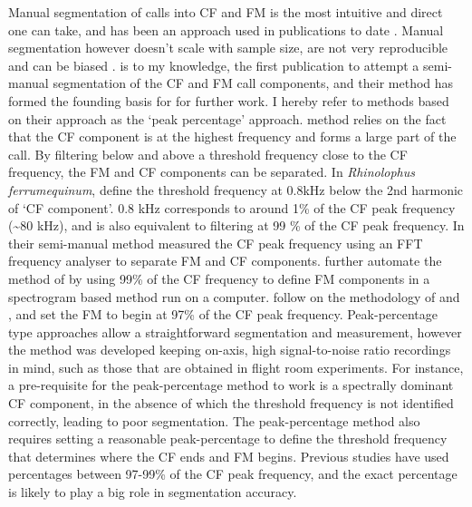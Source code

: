 \documentclass[
]{book}
\begin{document}
Manual segmentation of calls into CF and FM is the most intuitive and direct one can take, and has been an approach used in publications to date \citep{vater2003development, fawcett2015echolocation, gessinger2019unusual}. Manual segmentation however doesn't scale with sample size, are not very reproducible and can be biased \citep{brumm2017measurement}. \citet{tian1997echolocation} is to my knowledge, the first publication to attempt a semi-manual segmentation of the CF and FM call components, and their method has formed the founding basis for for further work. I hereby refer to methods based on their approach as the `peak percentage' approach. \citet{tian1997echolocation} method relies on the fact that the CF component is at the highest frequency and forms a large part of the call. By filtering below and above a threshold frequency close to the CF frequency, the FM and CF components can be separated. In \emph{Rhinolophus ferrumequinum}, \citet{tian1997echolocation} define the threshold frequency at 0.8kHz below the 2nd harmonic of `CF component'. 0.8 kHz corresponds to around 1\% of the CF peak frequency (\textasciitilde80 kHz), and is also equivalent to filtering at 99 \% of the CF peak frequency. In their semi-manual method \citet{tian1997echolocation} measured the CF peak frequency using an FFT frequency analyser to separate FM and CF components. \citet{schoeppler2018precise} further automate the method of \citet{tian1997echolocation} by using 99\% of the CF frequency to define FM components in a spectrogram based method run on a computer. \citet{lu2020echolocating} follow on the methodology of \citet{schoeppler2018precise} and \citet{tian1997echolocation}, and set the FM to begin at 97\% of the CF peak frequency. Peak-percentage type approaches allow a straightforward segmentation and measurement, however the method was developed keeping on-axis, high signal-to-noise ratio recordings in mind, such as those that are obtained in flight room experiments. For instance, a pre-requisite for the peak-percentage method to work is a spectrally dominant CF component, in the absence of which the threshold frequency is not identified correctly, leading to poor segmentation. The peak-percentage method also requires setting a reasonable peak-percentage to define the threshold frequency that determines where the CF ends and FM begins. Previous studies have used percentages between 97-99\% of the CF peak frequency, and the exact percentage is likely to play a big role in segmentation accuracy.
\end{document}
